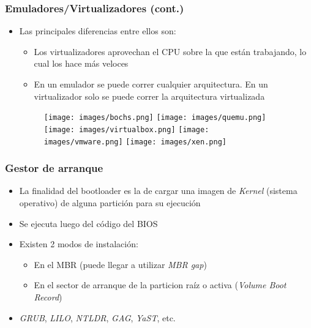 \begin{frame}
	\frametitle{Emuladores/Virtualizadores (cont.)}
	\begin{itemize}
		\item Las principales diferencias entre ellos son:
		\begin{itemize}
			\item Los virtualizadores aprovechan el CPU sobre la que están trabajando, lo cual los hace más veloces
			\item En un emulador se puede correr cualquier arquitectura. En un virtualizador solo se puede correr la arquitectura virtualizada
		\end{itemize}
		\begin{figure}[h]
			\texttt{[image: images/bochs.png]}
			\hspace{30px}
			\texttt{[image: images/quemu.png]}
			\hspace{30px}
			\texttt{[image: images/virtualbox.png]}
			\hspace{30px}
			\texttt{[image: images/vmware.png]}
			\hspace{30px}
			\texttt{[image: images/xen.png]}
		\end{figure}		
	\end{itemize}
\end{frame}

\begin{frame}
	\frametitle{Gestor de arranque}
	\begin{itemize}
		\item La finalidad del bootloader es la de cargar una imagen de \textit{Kernel} (sistema operativo) de alguna partición para su ejecución
		\item Se ejecuta luego del código del BIOS		
		\item Existen 2 modos de instalación:
		\begin{itemize}
			\item En el MBR (puede llegar a utilizar \textit{MBR gap})
			\item En el sector de arranque de la particion raíz o activa (\textit{Volume Boot Record})
		\end{itemize}
		\item \emph{GRUB}, \emph{LILO}, \emph{NTLDR}, \emph{GAG}, \emph{YaST}, etc.
	\end{itemize}
\end{frame}

